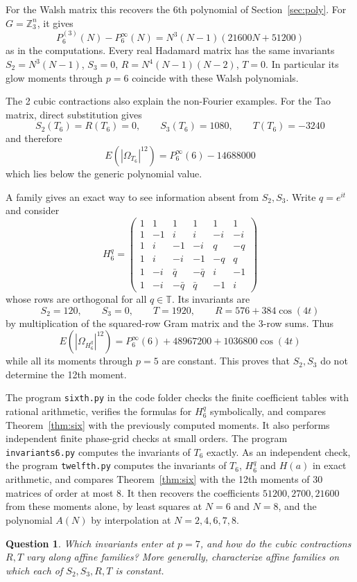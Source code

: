 \documentclass[11pt,a4paper]{article}
\newtheorem{question}[thm]{Question}
\theoremstyle{remark}
\begin{document}
For the Walsh matrix this recovers the 6th polynomial of Section~\ref{sec:poly}. For $G=\mathbb Z_3^n$, it gives
\[
 P^{(3)}_6(N)-P^\infty_6(N)=N^3(N-1)(21600N+51200)
\]
as in the computations. Every real Hadamard matrix has the same invariants $S_2=N^3(N-1)$, $S_3=0$, $R=N^4(N-1)(N-2)$, $T=0$. In particular its glow moments through $p=6$ coincide with these Walsh polynomials.

The 2 cubic contractions also explain the non-Fourier examples. For the Tao matrix, direct substitution gives
\[
 S_2(T_6)=R(T_6)=0,\qquad S_3(T_6)=1080,\qquad T(T_6)=-3240
\]
and therefore
\[
 E(|\Omega_{T_6}|^{12})=P^\infty_6(6)-14688000
\]
which lies below the generic polynomial value.

A family gives an exact way to see information absent from $S_2,S_3$. Write $q=e^{it}$ and consider
\[
 H_6^q=
 \begin{pmatrix}
 1&1&1&1&1&1\\
 1&-1&i&i&-i&-i\\
 1&i&-1&-i&q&-q\\
 1&i&-i&-1&-q&q\\
 1&-i&\bar q&-\bar q&i&-1\\
 1&-i&-\bar q&\bar q&-1&i
 \end{pmatrix}
\]
whose rows are orthogonal for all $q\in\mathbb T$. Its invariants are
\[
 S_2=120,\qquad S_3=0,\qquad T=1920,\qquad R=576+384\cos(4t)
\]
by multiplication of the squared-row Gram matrix and the 3-row sums. Thus
\[
 E(|\Omega_{H_6^q}|^{12})
       =P^\infty_6(6)+48967200+1036800\cos(4t)
\]
while all its moments through $p=5$ are constant. This proves that $S_2,S_3$ do not determine the 12th moment.

The program \texttt{sixth.py} in the code folder checks the finite coefficient tables with rational arithmetic, verifies the formulas for $H_6^q$ symbolically, and compares Theorem~\ref{thm:six} with the previously computed moments. It also performs independent finite phase-grid checks at small orders. The program \texttt{invariants6.py} computes the invariants of $T_6$ exactly. As an independent check, the program \texttt{twelfth.py} computes the invariants of $T_6$, $H_6^q$ and $H(a)$ in exact arithmetic, and compares Theorem~\ref{thm:six} with the 12th moments of 30 matrices of order at most 8. It then recovers the coefficients $51200,2700,21600$ from these moments alone, by least squares at $N=6$ and $N=8$, and the polynomial $A(N)$ by interpolation at $N=2,4,6,7,8$.

\begin{samepage}
\begin{question}\label{que:seven}
Which invariants enter at $p=7$, and how do the cubic contractions $R,T$ vary along affine families? More generally, characterize affine families on which each of $S_2,S_3,R,T$ is constant.
\end{question}
\end{samepage}
\end{document}
